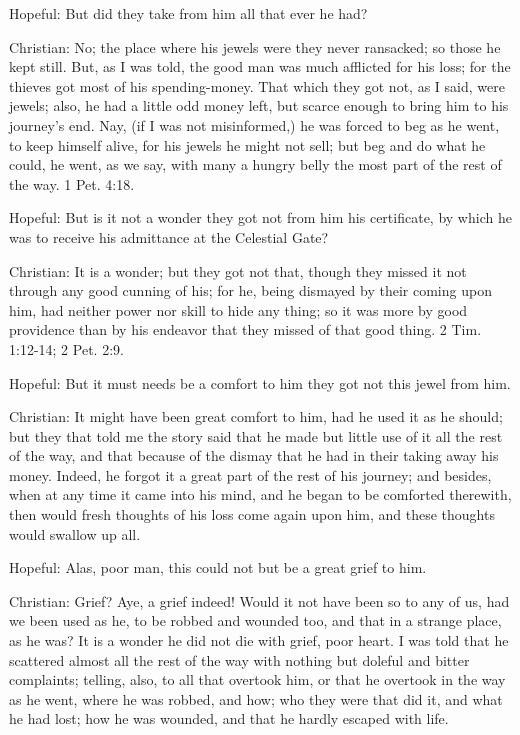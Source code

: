 Hopeful: But did they take from him all that ever he had?

Christian: No; the place where his jewels were they never ransacked; so
those he kept still. But, as I was told, the good man was much
afflicted for his loss; for the thieves got most of his spending-money.
That which they got not, as I said, were jewels; also, he had a little
odd money left, but scarce enough to bring him to his journey's end.
Nay, (if I was not misinformed,) he was forced to beg as he went, to
keep himself alive, for his jewels he might not sell; but beg and do
what he could, he went, as we say, with many a hungry belly the most
part of the rest of the way. 1 Pet. 4:18.

Hopeful: But is it not a wonder they got not from him his certificate,
by which he was to receive his admittance at the Celestial Gate?

Christian: It is a wonder; but they got not that, though they missed it
not through any good cunning of his; for he, being dismayed by their
coming upon him, had neither power nor skill to hide any thing; so it
was more by good providence than by his endeavor that they missed of
that good thing. 2 Tim. 1:12-14; 2 Pet. 2:9.

Hopeful: But it must needs be a comfort to him they got not this jewel
from him.

Christian: It might have been great comfort to him, had he used it as
he should; but they that told me the story said that he made but little
use of it all the rest of the way, and that because of the dismay that
he had in their taking away his money. Indeed, he forgot it a great
part of the rest of his journey; and besides, when at any time it came
into his mind, and he began to be comforted therewith, then would fresh
thoughts of his loss come again upon him, and these thoughts would
swallow up all.

Hopeful: Alas, poor man, this could not but be a great grief to him.

Christian: Grief? Aye, a grief indeed! Would it not have been so to any
of us, had we been used as he, to be robbed and wounded too, and that
in a strange place, as he was? It is a wonder he did not die with
grief, poor heart. I was told that he scattered almost all the rest of
the way with nothing but doleful and bitter complaints; telling, also,
to all that overtook him, or that he overtook in the way as he went,
where he was robbed, and how; who they were that did it, and what he
had lost; how he was wounded, and that he hardly escaped with life.

